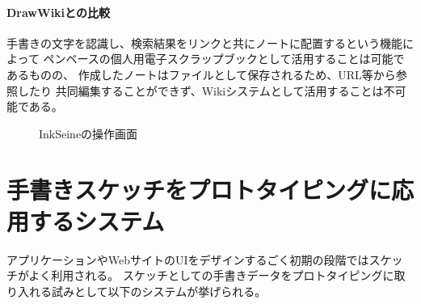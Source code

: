 \paragraph*{DrawWikiとの比較}
手書きの文字を認識し、検索結果をリンクと共にノートに配置するという機能によって
ペンベースの個人用電子スクラップブックとして活用することは可能であるものの、
作成したノートはファイルとして保存されるため、URL等から参照したり
共同編集することができず、Wikiシステムとして活用することは不可能である。


\begin{figure}[H]
    \centering
    \caption{InkSeineの操作画面}
    \label{inkseine}
\end{figure}

\section{手書きスケッチをプロトタイピングに応用するシステム}
アプリケーションやWebサイトのUIをデザインするごく初期の段階ではスケッチがよく利用される\cite{Newman2000SitemapsSA}。
スケッチとしての手書きデータをプロトタイピングに取り入れる試みとして以下のシステムが挙げられる。

